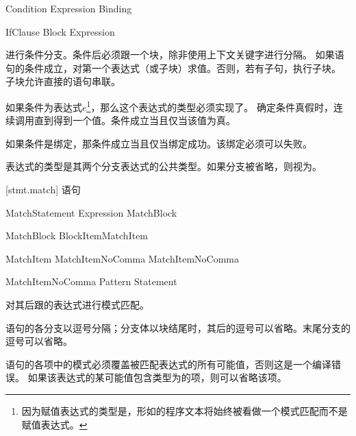 \begin{bnf}{Condition}
    Expression \br
    Binding
\end{bnf}

\begin{bnf}{IfClause}
    Block \br
     Expression
\end{bnf}

\pnum
{}进行条件分支。条件后必须跟一个块，除非使用上下文关键字进行分隔。
如果语句的条件成立，对第一个表达式（或子块）求值。否则，若有子句，执行子块。
子块允许直接的语句串联。

\pnum
如果条件为表达式$e$\footnote{因为赋值表达式的类型是，形如的程序文本将始终被看做一个模式匹配而不是赋值表达式。}，那么这个表达式的类型必须实现了。
确定条件真假时，连续调用直到得到一个值。条件成立当且仅当该值为真。

\pnum
如果条件是绑定，那条件成立当且仅当绑定成功。该绑定必须可以失败。

\pnum
{}表达式的类型是其两个分支表达式的公共类型。如果分支被省略，则视为。

[stmt.match]{ 语句}

\begin{bnf}{MatchStatement}
     Expression MatchBlock
\end{bnf}

\begin{bnf}{MatchBlock}
    \terminal{\{} BlockItem\bnfs MatchItem\bnfp \terminal{\}}
\end{bnf}

\begin{bnf}{MatchItem}
    MatchItemNoComma \terminal{,}\bnfq \br
    MatchItemNoComma \terminal{,}
\end{bnf}

\begin{bnf}{MatchItemNoComma}
    Pattern \terminal{=>} Statement
\end{bnf}

\pnum
{}对其后跟的表达式进行模式匹配。

\pnum
{}语句的各分支以逗号分隔；分支体以块结尾时，其后的逗号可以省略。末尾分支的逗号可以省略。

\pnum
{}语句的各项中的模式必须覆盖被匹配表达式的所有可能值，否则这是一个编译错误。
如果该表达式的某可能值包含类型为的项，则可以省略该项。


